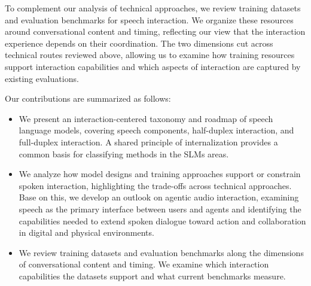 To complement our analysis of technical approaches, we review training datasets and evaluation benchmarks for speech interaction. We organize these resources around conversational content and timing, reflecting our view that the interaction experience depends on their coordination. The two dimensions cut across technical routes reviewed above, allowing us to examine how training resources support interaction capabilities and which aspects of interaction are captured by existing evaluations.



\begin{samepage}
Our contributions are summarized as follows:
\begin{itemize}
    \item We present an interaction-centered taxonomy and roadmap of speech language models, covering speech components, half-duplex interaction, and full-duplex interaction. A shared principle of internalization provides a common basis for classifying methods in the SLMs areas.
    \item We analyze how model designs and training approaches support or constrain spoken interaction, highlighting the trade-offs across technical approaches. Base on this, we develop an outlook on agentic audio interaction, examining speech as the primary interface between users and agents and identifying the capabilities needed to extend spoken dialogue toward action and collaboration in digital and physical environments.
    \item We review training datasets and evaluation benchmarks along the dimensions of conversational content and timing. We examine which interaction capabilities the datasets support and what current benchmarks measure.
\end{itemize}
\end{samepage}